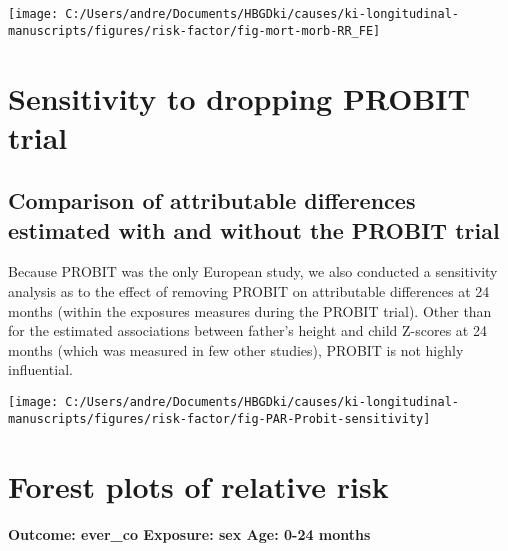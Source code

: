 \documentclass[
  9pt,
]{book}
\begin{document}
\texttt{[image: C:/Users/andre/Documents/HBGDki/causes/ki-longitudinal-manuscripts/figures/risk-factor/fig-mort-morb-RR\_FE]}

\hypertarget{no-PROBIT}{%
\chapter{Sensitivity to dropping PROBIT trial}\label{no-PROBIT}}

\raggedright

\hypertarget{comparison-of-attributable-differences-estimated-with-and-without-the-probit-trial}{%
\section{Comparison of attributable differences estimated with and without the PROBIT trial}\label{comparison-of-attributable-differences-estimated-with-and-without-the-probit-trial}}

Because PROBIT was the only European study, we also conducted a sensitivity analysis as to the effect of removing PROBIT on attributable differences at 24 months (within the exposures measures during the PROBIT trial). Other than for the estimated associations between father's height and child Z-scores at 24 months (which was measured in few other studies), PROBIT is not highly influential.

\texttt{[image: C:/Users/andre/Documents/HBGDki/causes/ki-longitudinal-manuscripts/figures/risk-factor/fig-PAR-Probit-sensitivity]}

\hypertarget{RR-forest}{%
\chapter{Forest plots of relative risk}\label{RR-forest}}

\raggedright

\hypertarget{outcome-ever_co-exposure-sex-age-0-24-months}{%
\subsubsection{Outcome: ever\_co Exposure: sex Age: 0-24 months}\label{outcome-ever_co-exposure-sex-age-0-24-months}}

  
\end{document}
